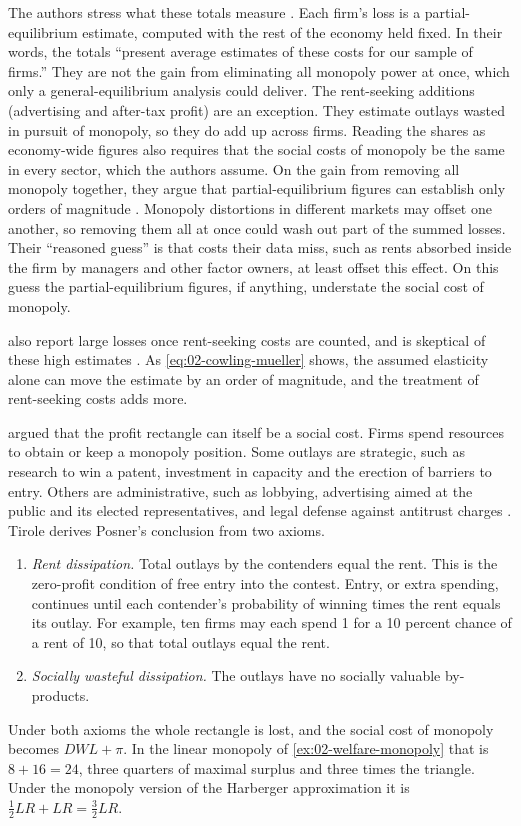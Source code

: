 The authors stress what these totals measure \citep[p.~739]{CowlingMueller1978}. Each firm's loss is a
partial-equilibrium estimate, computed with the rest of the economy held fixed. In their words, the totals ``present
average estimates of these costs for our sample of firms.'' They are not the gain from eliminating all monopoly power
at once, which only a general-equilibrium analysis could deliver. The rent-seeking additions (advertising and
after-tax profit) are an exception. They estimate outlays wasted in pursuit of monopoly, so they do add up across
firms. Reading the shares as economy-wide figures also requires that the social costs of monopoly be the same in
every sector, which the authors assume. On the gain from removing all monopoly together, they argue that partial-equilibrium figures can establish
only orders of magnitude \citep[pp.~744--745]{CowlingMueller1978}.
Monopoly distortions in different markets may offset one another, so removing them all at once could wash out part of
the summed losses. Their ``reasoned guess'' is that costs their data miss, such as rents absorbed inside the firm by
managers and other factor owners, at least offset this effect. On this guess the partial-equilibrium figures, if
anything, understate the social cost of monopoly.

\citet{JennyWeber1983} also report large losses once rent-seeking costs are
counted, and \citet{Scherer1980} is skeptical of these high estimates \citep[sec.~1.1.1.2]{Tirole1988}. As
\eqref{eq:02-cowling-mueller} shows, the assumed elasticity alone can move the estimate by an order of magnitude,
and the treatment of rent-seeking costs adds more.

\citet{Posner1975} argued that the profit rectangle can itself be a social cost. Firms spend resources to obtain or
keep a monopoly position. Some outlays are strategic, such as research to win a patent, investment in capacity and
the erection of barriers to entry. Others are administrative, such as lobbying, advertising aimed at the public and
its elected representatives, and legal defense against antitrust charges \citep[sec.~1.3]{Tirole1988}. Tirole
derives Posner's conclusion from two axioms.
\begin{enumerate}[label=(\roman*)]
\item \emph{Rent dissipation.} Total outlays by the contenders equal the rent. This is the zero-profit condition of
  free entry into the contest. Entry, or extra spending, continues until each contender's probability of winning
  times the rent equals its outlay. For example, ten firms may each spend 1 for a 10 percent chance of a rent of 10,
  so that total outlays equal the rent.
\item \emph{Socially wasteful dissipation.} The outlays have no socially valuable by-products.
\end{enumerate}
Under both axioms the whole rectangle is lost, and the social cost of monopoly becomes $\mathit{DWL} + \pi$. In the linear monopoly of \cref{ex:02-welfare-monopoly}
that is $8 + 16 = 24$, three quarters of maximal surplus and three times the triangle. Under the monopoly version
of the Harberger approximation it is $\frac{1}{2}LR + LR = \frac{3}{2}LR$.

